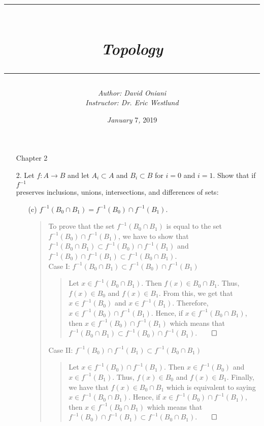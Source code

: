 \documentclass[12pt, a4paper]{article}
\title{\rule{\paperwidth - 150pt}{1pt}\textbf{\\\textit{Topology}\\}\rule{\paperwidth - 150pt}{1pt}}
\author
{
\textit{Author: David Oniani}
\\
\textit{Instructor: Dr. Eric Westlund}
}
\date{\textit{January }7\textit{, }2019}
\newcommand{\rarr}{\rightarrow}
\begin{document}
\maketitle


\begin{itemize}
\item[]
{\large Chapter 2}
\vspace{0.3cm}


\item[2.]
Let $f : A \rarr B$ and let $A_i \subset A$ and $B_i \subset B$
for $i = 0$ and $i = 1$. Show that if $f^{-1}$\\
preserves inclusions, unions, intersections, and differences of sets:

\begin{itemize}
\item[(c)]
$f^{-1}(B_0 \cap B_1) = f^{-1}(B_0) \cap f^{-1}(B_1)$.
\vspace{0.25cm}

\begin{quote}
To prove that the set $f^{-1}(B_0 \cap B_1)$
is equal to the set $f^{-1}(B_0) \cap f^{-1}(B_1)$,
we have to show that $f^{-1}(B_0 \cap B_1) \subset f^{-1}(B_0) \cap f^{-1}(B_1)$
and $f^{-1}(B_0) \cap f^{-1}(B_1) \subset f^{-1}(B_0 \cap B_1)$.
\\
\vspace{0.5cm}
Case I: $f^{-1}(B_0 \cap B_1) \subset f^{-1}(B_0) \cap f^{-1}(B_1)$\\
\vspace{0.15cm}

\begin{quote}
Let $x \in f^{-1}(B_0 \cap B_1)$. Then $f(x) \in B_0 \cap B_1$. Thus, $f(x) \in B_0$
and $f(x) \in B_1$. From this, we get that $x \in f^{-1}(B_0)$ and $x \in f^{-1}(B_1)$.
Therefore, $x \in f^{-1}(B_0) \cap f^{-1}(B_1)$. Hence, if $x \in f^{-1}(B_0 \cap B_1)$,
then $x \in f^{-1}(B_0) \cap f^{-1}(B_1)$ which means that $f^{-1}(B_0 \cap B_1) \subset f^{-1}(B_0) \cap f^{-1}(B_1)$.$\qed$
\end{quote}

\vspace{0.5cm}
Case II: $f^{-1}(B_0) \cap f^{-1}(B_1) \subset f^{-1}(B_0 \cap B_1)$\\
\vspace{0.15cm}

\begin{quote}
Let $x \in f^{-1}(B_0) \cap f^{-1}(B_1)$. Then $x \in f^{-1}(B_0)$ and $x \in f^{-1}(B_1)$.
Thus, $f(x) \in B_0$ and $f(x) \in B_1$. Finally, we have that $f(x) \in B_0 \cap B_1$ which
is equivalent to saying $x \in f^{-1}(B_0 \cap B_1)$. Hence, if $x \in f^{-1}(B_0) \cap f^{-1}(B_1)$,
then $x \in f^{-1}(B_0 \cap B_1)$ which means that $f^{-1}(B_0) \cap f^{-1}(B_1) \subset f^{-1}(B_0 \cap B_1)$.$\qed$
\end{quote}
\vspace{0.5cm}


\end{quote}
\end{itemize}
\end{itemize}
\end{document}
